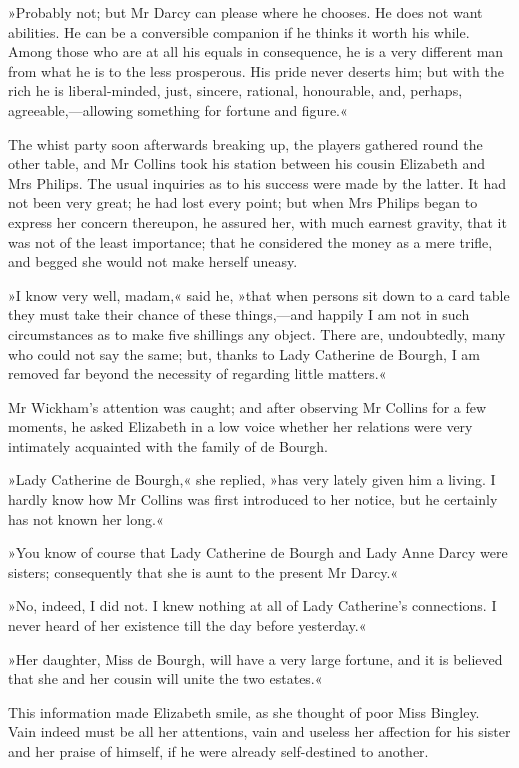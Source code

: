 »Probably not; but Mr Darcy can please where he chooses. He does not want abilities. He can be a conversible companion if he thinks it worth his while. Among those who are at all his equals in consequence, he is a very different man from what he is to the less prosperous. His pride never deserts him; but with the rich he is liberal-minded, just, sincere, rational, honourable, and, perhaps, agreeable,—allowing something for fortune and figure.«

The whist party soon afterwards breaking up, the players gathered round the other table, and Mr Collins took his station between his cousin Elizabeth and Mrs Philips. The usual inquiries as to his success were made by the latter. It had not been very great; he had lost every point; but when Mrs Philips began to express her concern thereupon, he assured her, with much earnest gravity, that it was not of the least importance; that he considered the money as a mere trifle, and begged she would not make herself uneasy.

»I know very well, madam,« said he, »that when persons sit down to a card table they must take their chance of these things,—and happily I am not in such circumstances as to make five shillings any object. There are, undoubtedly, many who could not say the same; but, thanks to Lady Catherine de Bourgh, I am removed far beyond the necessity of regarding little matters.«

Mr Wickham's attention was caught; and after observing Mr Collins for a few moments, he asked Elizabeth in a low voice whether her relations were very intimately acquainted with the family of de Bourgh.

»Lady Catherine de Bourgh,« she replied, »has very lately given him a living. I hardly know how Mr Collins was first introduced to her notice, but he certainly has not known her long.«

»You know of course that Lady Catherine de Bourgh and Lady Anne Darcy were sisters; consequently that she is aunt to the present Mr Darcy.«

»No, indeed, I did not. I knew nothing at all of Lady Catherine's connections. I never heard of her existence till the day before yesterday.«

»Her daughter, Miss de Bourgh, will have a very large fortune, and it is believed that she and her cousin will unite the two estates.«

This information made Elizabeth smile, as she thought of poor Miss Bingley. Vain indeed must be all her attentions, vain and useless her affection for his sister and her praise of himself, if he were already self-destined to another.

